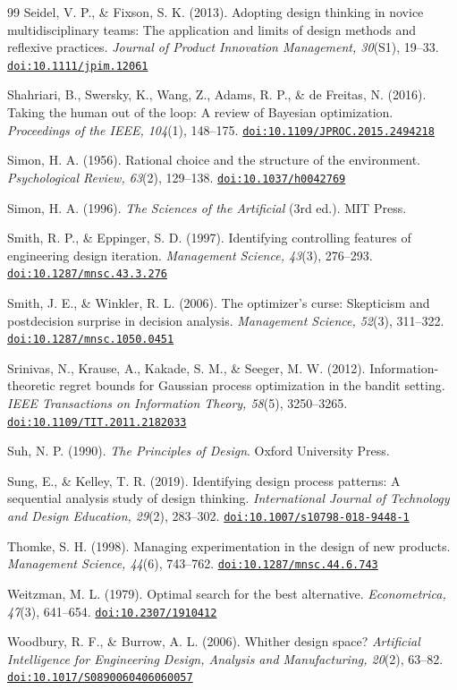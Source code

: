 \documentclass[preprint,review,11pt,authoryear]{elsarticle}
\providecommand{\doi}[1]{\href{https://doi.org/#1}{\nolinkurl{doi:#1}}}
\theoremstyle{definition}
\begin{document}
\begin{thebibliography}{99}
 Seidel, V. P., \& Fixson, S. K. (2013). Adopting design thinking in novice multidisciplinary teams: The application and limits of design methods and reflexive practices. \textit{Journal of Product Innovation Management, 30}(S1), 19--33. \doi{10.1111/jpim.12061}

 Shahriari, B., Swersky, K., Wang, Z., Adams, R. P., \& de Freitas, N. (2016). Taking the human out of the loop: A review of Bayesian optimization. \textit{Proceedings of the IEEE, 104}(1), 148--175. \doi{10.1109/JPROC.2015.2494218}

 Simon, H. A. (1956). Rational choice and the structure of the environment. \textit{Psychological Review, 63}(2), 129--138. \doi{10.1037/h0042769}

 Simon, H. A. (1996). \textit{The Sciences of the Artificial} (3rd ed.). MIT Press.

 Smith, R. P., \& Eppinger, S. D. (1997). Identifying controlling features of engineering design iteration. \textit{Management Science, 43}(3), 276--293. \doi{10.1287/mnsc.43.3.276}

 Smith, J. E., \& Winkler, R. L. (2006). The optimizer's curse: Skepticism and postdecision surprise in decision analysis. \textit{Management Science, 52}(3), 311--322. \doi{10.1287/mnsc.1050.0451}

 Srinivas, N., Krause, A., Kakade, S. M., \& Seeger, M. W. (2012). Information-theoretic regret bounds for Gaussian process optimization in the bandit setting. \textit{IEEE Transactions on Information Theory, 58}(5), 3250--3265. \doi{10.1109/TIT.2011.2182033}

 Suh, N. P. (1990). \textit{The Principles of Design}. Oxford University Press.

 Sung, E., \& Kelley, T. R. (2019). Identifying design process patterns: A sequential analysis study of design thinking. \textit{International Journal of Technology and Design Education, 29}(2), 283--302. \doi{10.1007/s10798-018-9448-1}

 Thomke, S. H. (1998). Managing experimentation in the design of new products. \textit{Management Science, 44}(6), 743--762. \doi{10.1287/mnsc.44.6.743}

 Weitzman, M. L. (1979). Optimal search for the best alternative. \textit{Econometrica, 47}(3), 641--654. \doi{10.2307/1910412}

 Woodbury, R. F., \& Burrow, A. L. (2006). Whither design space? \textit{Artificial Intelligence for Engineering Design, Analysis and Manufacturing, 20}(2), 63--82. \doi{10.1017/S0890060406060057}

\end{thebibliography}
\end{document}
